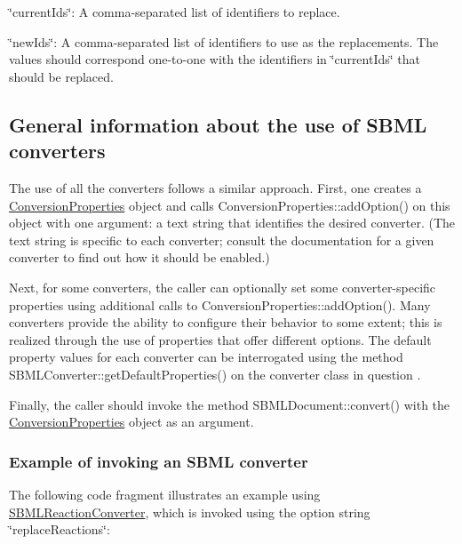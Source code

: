 \begin{DoxyItemize}
\item {\ttfamily \char`\"{}current\+Ids\char`\"{}}\+: A comma-\/separated list of identifiers to replace. \item {\ttfamily \char`\"{}new\+Ids\char`\"{}}\+: A comma-\/separated list of identifiers to use as the replacements. The values should correspond one-\/to-\/one with the identifiers in {\ttfamily \char`\"{}current\+Ids\char`\"{}} that should be replaced.\end{DoxyItemize}
\hypertarget{classdoc__section__using__sbml__converters_using-converters}{}\subsection{General information about the use of S\+B\+M\+L converters}\label{classdoc__section__using__sbml__converters_using-converters}
The use of all the converters follows a similar approach. First, one creates a \hyperlink{class_conversion_properties}{Conversion\+Properties} object and calls Conversion\+Properties\+::add\+Option() on this object with one argument\+: a text string that identifies the desired converter. (The text string is specific to each converter; consult the documentation for a given converter to find out how it should be enabled.)

Next, for some converters, the caller can optionally set some converter-\/specific properties using additional calls to Conversion\+Properties\+::add\+Option(). Many converters provide the ability to configure their behavior to some extent; this is realized through the use of properties that offer different options. The default property values for each converter can be interrogated using the method S\+B\+M\+L\+Converter\+::get\+Default\+Properties() on the converter class in question .

Finally, the caller should invoke the method S\+B\+M\+L\+Document\+::convert() with the \hyperlink{class_conversion_properties}{Conversion\+Properties} object as an argument.\hypertarget{classdoc__section__using__sbml__converters_converter-example}{}\subsubsection{Example of invoking an S\+B\+M\+L converter}\label{classdoc__section__using__sbml__converters_converter-example}
The following code fragment illustrates an example using \hyperlink{class_s_b_m_l_reaction_converter}{S\+B\+M\+L\+Reaction\+Converter}, which is invoked using the option string {\ttfamily \char`\"{}replace\+Reactions\char`\"{}}\+:

